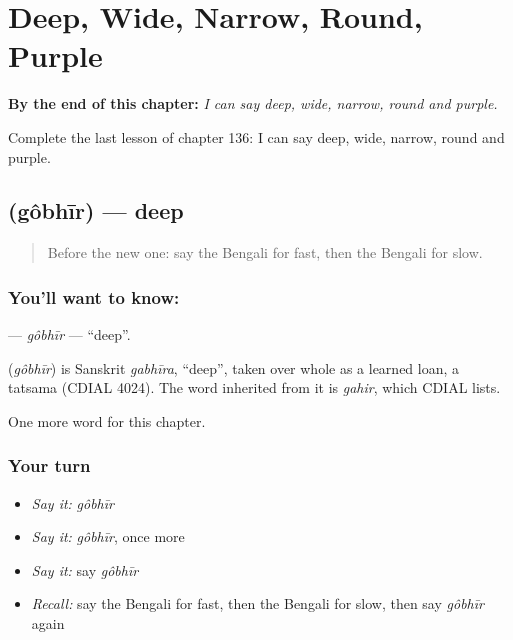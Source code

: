 
\chapter{Deep, Wide, Narrow, Round, Purple}
\label{ch:bn-deep-wide-narrow-round-purple}

\begin{chapteropening}
\textbf{By the end of this chapter:} \emph{I can say deep, wide, narrow, round and purple.}

Complete the last lesson of chapter 136: I can say deep, wide, narrow, round and purple.
\end{chapteropening}

\section[\texorpdfstring{\bn{গভীর} (gôbhīr)}{গভীর (gôbhīr)}]{ (gôbhīr) — deep}

\label{lesson:BN-C136-gobhir}



\begin{quote}
Before the new one: say the Bengali for fast, then the Bengali for slow.
\end{quote}

\subsection*{You'll want to know: }
\textbf{} — \emph{gôbhīr} — \textquotedblleft{}deep\textquotedblright{}.

\begin{cousinweb}
\textbf{} (\emph{gôbhīr}) is Sanskrit \emph{gabhīra}, \textquotedblleft{}deep\textquotedblright{}, taken over whole as a learned loan, a tatsama (CDIAL 4024). The word inherited from it is \emph{gahir}, which CDIAL lists.
\end{cousinweb}

\begin{grammarlens}[title={What you've built}]
One more word for this chapter.
\end{grammarlens}

\subsection*{Your turn}
\begin{itemize}
\raggedright
  \item \emph{Say it:} \emph{gôbhīr}
  \item \emph{Say it:} \emph{gôbhīr}, once more
  \item \emph{Say it:} say \emph{gôbhīr}
  \item \emph{Recall:} say the Bengali for fast, then the Bengali for slow, then say \emph{gôbhīr} again
\end{itemize}

